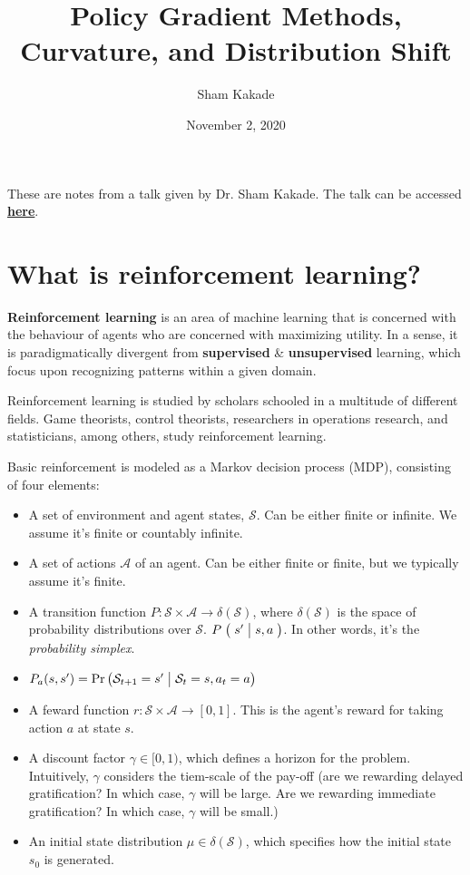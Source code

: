 \documentclass[12pt,reqno]{amsart}
\title{Policy Gradient Methods, Curvature, and Distribution Shift}
\date{November 2, 2020}
\author{Sham Kakade}
\newcommand{\Cond}[2]{\bigm( {#1} \bigm\vert {#2}\bigm)}
\begin{document}
\maketitle

These are notes from a talk given by Dr. Sham Kakade. The talk can be accessed 
\href{http://www.fields.utoronto.ca/talks/Policy-Gradient-Methods-Curvature-and-Distribution-Shift}{\textbf{here}}.

\section{What is reinforcement learning?}
\textbf{Reinforcement learning} is an area of machine learning that is concerned with the behaviour of agents who are concerned with maximizing utility. In a sense, it is paradigmatically divergent from \textbf{supervised} \& \textbf{unsupervised} learning, which focus upon recognizing patterns within a given domain.

Reinforcement learning is studied by scholars schooled in a multitude of different fields. Game theorists, control theorists, researchers in operations research, and statisticians, among others, study reinforcement learning. 

Basic reinforcement is modeled as a Markov decision process (MDP), consisting of four elements:
\begin{itemize}
\item A set of environment and agent states, $\mathcal{S}$. Can be either finite or infinite. We assume it's finite or countably infinite.
\item A set of actions $\mathcal{A}$ of an agent. Can be either finite or finite, but we typically assume it's finite.
\item A transition function $P :\mathcal{S} \times \mathcal{A} \rightarrow \delta(\mathcal{S})$, where $\delta(\mathcal{S})$ is the space of probability distributions over $\mathcal{S}$. $P \Cond{s'}{s,a}$. In other words, it's the \textit{probability simplex}.
\item $P_{a}(s,s') = \Pr\left(\mathcal{S}_{t+1}=s' \bigm\vert \mathcal{S}_{t} = s, a_{t} = a \right)$
\item A feward function $r: \mathcal{S} \times \mathcal{A} \rightarrow [0,1]$. This is the agent's reward for taking action $a$ at state $s$.
\item A discount factor $\gamma \in [0,1)$, which defines a horizon for the problem. Intuitively, $\gamma$ considers the tiem-scale of the pay-off (are we rewarding delayed gratification? In which case, $\gamma$ will be large. Are we rewarding immediate gratification? In which case, $\gamma$ will be small.)
\item An initial state distribution $\mu \in \delta(\mathcal{S})$, which specifies how the initial state $s_{0}$ is generated.
\end{itemize}
\end{document}
